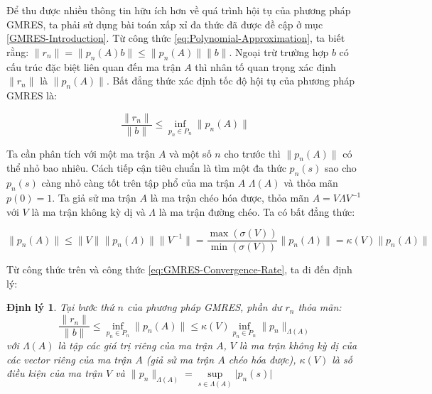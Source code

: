 \documentclass[14pt, a4paper]{article}
\numberwithin{equation}{section}
\numberwithin{algorithm}{section}
\numberwithin{figure}{section}
\newtheorem{dl}{Định lý}
\numberwithin{dl}{section}
\numberwithin{md}{section}
\numberwithin{bd}{section}
\numberwithin{dn}{section}
\numberwithin{hq}{section}
\begin{document}
Để thu được nhiều thông tin hữu ích hơn về quá trình hội tụ của phương pháp GMRES, ta phải sử dụng bài toán xấp xỉ đa thức đã được đề cập ở mục \ref{GMRES-Introduction}. Từ công thức \ref{eq:Polynomial-Approximation}, ta biết rằng: $\lVert r_n \rVert=\lVert p_n(A)b \rVert \leq \lVert p_n(A) \rVert \lVert b \rVert$. Ngoại trừ trường hợp $b$ có cấu trúc đặc biệt liên quan đến ma trận $A$ thì nhân tố quan trọng xác định $ \lVert r_n \rVert$ là $\lVert p_n(A) \rVert$. Bất đẳng thức xác định tốc độ hội tụ của phương pháp GMRES là:

\begin{equation} \label{eq:GMRES-Convergence-Rate}
    \dfrac{\lVert r_n \rVert}{\lVert b \rVert} \leq \inf_{p_n \in P_n} \lVert p_n(A) \rVert
\end{equation}

Ta cần phân tích với một ma trận $A$ và một số $n$ cho trước thì $\lVert p_n(A) \rVert$ có thể nhỏ bao nhiêu. Cách tiếp cận tiêu chuẩn là tìm một đa thức $p_n(s)$ sao cho $p_n(s)$ càng nhỏ càng tốt trên tập phổ của ma trận $A$ $\Lambda(A)$ và thỏa mãn $p(0)=1$. Ta giả sử ma trận $A$ là ma trận chéo hóa được, thỏa mãn $A=V\Lambda V^{-1}$ với $V$ là ma trận không kỳ dị và $\Lambda$ là ma trận đường chéo. Ta có bất đẳng thức:

\begin{equation}
    \lVert p_n(A) \rVert \leq \lVert V \rVert \lVert p_n(\Lambda) \rVert \lVert V^{-1} \rVert = \dfrac{\max(\sigma(V))}{\min(\sigma(V))} \lVert p_n(\Lambda) \rVert = \kappa(V) \lVert p_n(\Lambda) \rVert
\end{equation}

Từ công thức trên và công thức \ref{eq:GMRES-Convergence-Rate}, ta đi đến định lý:

\begin{dl} \label{dl:GMRES-Convergence-Rate}
    Tại bước thứ $n$ của phương pháp GMRES, phần dư $r_n$ thỏa mãn:
    \begin{equation}
        \dfrac{\lVert r_n \rVert}{\lVert b \rVert} \leq \inf_{p_n \in P_n} \lVert p_n(A) \rVert \leq \kappa(V) \inf_{p_n \in P_n} \lVert p_n \rVert_{\Lambda(A)}
    \end{equation}
    với $\Lambda(A)$ là tập các giá trị riêng của ma trận $A$, $V$ là ma trận không kỳ dị của các vector riêng của ma trận $A$ (giả sử ma trận $A$ chéo hóa được), $\kappa(V)$ là số điều kiện của ma trận $V$ và $\lVert p_n \rVert_{\Lambda(A)}=\underset{s \in \Lambda(A)}{\sup} \lvert p_n(s) \rvert$
\end{dl}
\end{document}
